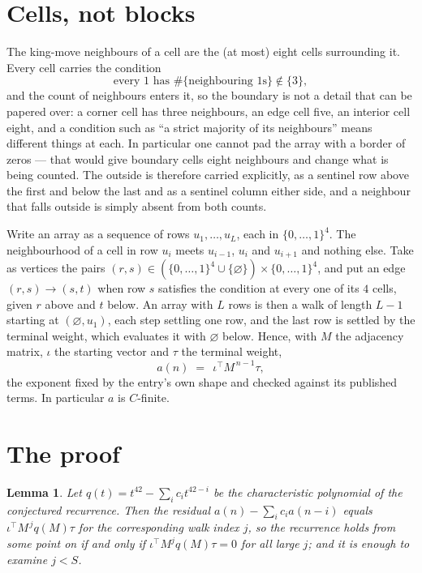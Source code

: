 \documentclass[11pt,a4paper]{article}
\theoremstyle{plain}
\newtheorem{lemma}[theorem]{Lemma}
\theoremstyle{definition}
\begin{document}
\section{Cells, not blocks}

The king-move neighbours of a cell are the (at most) eight cells surrounding it. Every cell
carries the condition
\[
\text{every }1\text{ has }\#\{\text{neighbouring }1\text{s}\}\notin\{3\},
\]
and the count of neighbours enters it, so the boundary is not a detail that can be papered
over: a corner cell has three neighbours, an edge cell five, an interior cell eight, and a
condition such as ``a strict majority of its neighbours'' means different things at each. In
particular one cannot pad the array with a border of zeros --- that would give boundary cells
eight neighbours and change what is being counted. The outside is therefore carried
explicitly, as a sentinel row above the first and below the last and as a sentinel column
either side, and a neighbour that falls outside is simply absent from both counts.

Write an array as a sequence of rows $u_1,\dots,u_L$, each in
$\{0,\dots,1\}^{4}$. The neighbourhood of a cell in row $u_i$ meets $u_{i-1}$,
$u_i$ and $u_{i+1}$ and nothing else. Take as vertices the pairs
$(r,s)\in(\{0,\dots,1\}^{4}\cup\{\varnothing\})\times\{0,\dots,1\}^{4}$,
and put an edge $(r,s)\to(s,t)$ when row $s$ satisfies the condition at every one of its
$4$ cells, given $r$ above and $t$ below. An array with $L$ rows is then a walk of length
$L-1$ starting at $(\varnothing,u_1)$, each step settling one row, and the last row is
settled by the terminal weight, which evaluates it with $\varnothing$ below. Hence,
with $M$ the adjacency matrix, $\iota$ the starting vector and $\tau$ the terminal weight,
\[
a(n)\;=\;\,\iota^{\!\top}M^{\,n-1}\tau ,
\]
the exponent fixed by the entry's own shape and checked against its published terms. In
particular $a$ is $C$-finite.

\section{The proof}

\begin{lemma}\label{lem:crit}
Let $q(t)=t^{42}-\sum_i c_it^{42-i}$ be the characteristic polynomial of the
conjectured recurrence. Then the residual $a(n)-\sum_ic_ia(n-i)$ equals
$\iota^{\!\top}M^{\,j}q(M)\tau$ for the corresponding walk index $j$, so the
recurrence holds from some point on if and only if $\iota^{\!\top}M^{j}q(M)\tau=0$ for all
large $j$; and it is enough to examine $j<S$.
\end{lemma}
\end{document}
